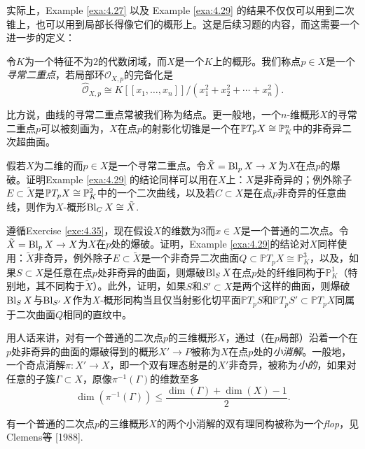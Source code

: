 实际上，Example \ref{exa:4.27} 以及 Example \ref{exa:4.29} 的结果不仅仅可以用到二次锥上，也可以用到局部长得像它们的概形上。这是后续习题的内容，而这需要一个进一步的定义：

\begin{defi}\label{defi:4.34}
	令$K$为一个特征不为$2$的代数闭域，而$X$是一个$K$上的概形。我们称点$p\in X$是一个\textit{寻常二重点}，若局部环$\mathscr O_{X,p}$的完备化是
	\[
		\hat{\mathscr O}_{X,p}\cong K[\![x_1,\dots,x_n]\!]/(x_1^2+x_2^2+\cdots+x_n^2).
	\]
\end{defi}


比方说，曲线的寻常二重点常被我们称为结点。更一般地，一个$n$-维概形$X$的寻常二重点$p$可以被刻画为，$X$在点$p$的射影化切锥是一个在$\mathbb{P} T_pX\cong \mathbb{P}_K^n$中的非奇异二次超曲面。

\begin{exe}\label{exe:4.35}
	假若$X$为二维的而$p\in X$是一个寻常二重点。令$\tilde X=\operatorname{Bl}_p X\to X$为$X$在点$p$的爆破。证明Example \ref{exa:4.29} 的结论同样可以用在$X$上：$X$是非奇异的；例外除子$E\subset \tilde X$是$\mathbb{P} T_pX\cong \mathbb{P}_K^2$中的一个二次曲线，以及若$C\subset X$是在点$p$非奇异的任意曲线，则作为$X$-概形$\operatorname{Bl}_C X\cong \tilde X$.
\end{exe}

\begin{exe}\label{exe:4.36}
	遵循Exercise \ref{exe:4.35}，现在假设$X$的维数为$3$而$x\in X$是一个普通的二次点。令$\tilde X=\operatorname{Bl}_p X\to X$为$X$在$p$处的爆破。证明，Example \ref{exa:4.29}的结论对$X$同样使用：$\tilde X$非奇异，例外除子$E\subset \tilde X$是一个非奇异二次曲面$Q\subset \mathbb PT_pX\cong \mathbb P_K^3$，以及，如果$S\subset X$是任意在点$p$处非奇异的曲面，则爆破$\operatorname{Bl}_SX$在点$p$处的纤维同构于$\mathbb P_K^1$（特别地，其不同构于$\tilde X$）。此外，证明，如果$S$和$S'\subset X$是两个这样的曲面，则爆破$\operatorname{Bl}_SX$与$\operatorname{Bl}_{S'}X$作为$X$-概形同构当且仅当射影化切平面$\mathbb PT_pS$和$\mathbb PT_pS'\subset \mathbb PT_pX$同属于二次曲面$Q$相同的直纹中。
\end{exe}

用人话来讲，对有一个普通的二次点$p$的三维概形$X$，通过（在$p$局部）沿着一个在$p$处非奇异的曲面的爆破得到的概形$X'\to P$被称为$X$在点$p$处的\textit{小消解}。一般地，一个奇点消解$\pi:X'\to X$，即一个双有理态射是的$X'$非奇异，被称为\textit{小的}，如果对任意的子簇$\Gamma\subset X$，原像$\pi^{-1}(\Gamma)$的维数至多
\[
	\dim (\pi^{-1}(\Gamma))\leq \frac{\dim(\Gamma)+\dim(X)-1}2 .
\]

有一个普通的二次点$p$的三维概形$X$的两个小消解的双有理同构被称为一个\textit{flop}，见Clemens等 [1988]. \nottran

